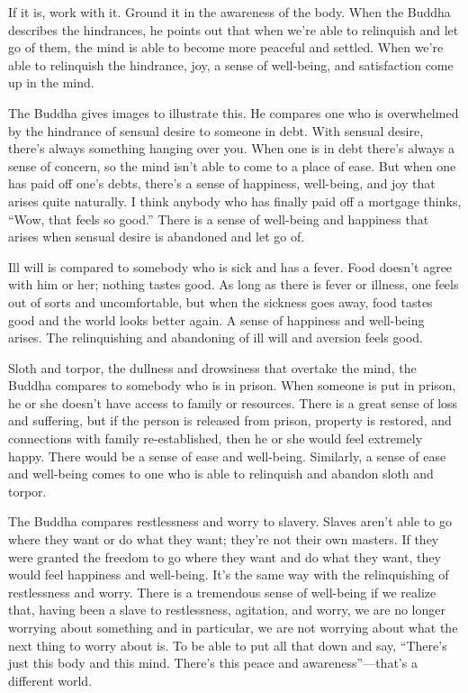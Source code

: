 If it is, work with it. Ground it in the awareness of the body. When the
Buddha describes the hindrances, he points out that when we’re able to
relinquish and let go of them, the mind is able to become more peaceful
and settled. When we’re able to relinquish the hindrance, joy, a sense
of well-being, and satisfaction come up in the mind.

The Buddha gives images to illustrate this. He compares one who is
overwhelmed by the hindrance of sensual desire to someone in debt. With
sensual desire, there’s always something hanging over you. When one is
in debt there’s always a sense of concern, so the mind isn’t able to
come to a place of ease. But when one has paid off one’s debts, there’s
a sense of happiness, well-being, and joy that arises quite naturally. I
think anybody who has finally paid off a mortgage thinks, “Wow, that
feels so good.” There is a sense of well-being and happiness that arises
when sensual desire is abandoned and let go of.

Ill will is compared to somebody who is sick and has a fever. Food
doesn’t agree with him or her; nothing tastes good. As long as there is
fever or illness, one feels out of sorts and uncomfortable, but when the
sickness goes away, food tastes good and the world looks better again. A
sense of happiness and well-being arises. The relinquishing and
abandoning of ill will and aversion feels good.

Sloth and torpor, the dullness and drowsiness that overtake the mind,
the Buddha compares to somebody who is in prison. When someone is put in
prison, he or she doesn’t have access to family or resources. There is a
great sense of loss and suffering, but if the person is released from
prison, property is restored, and connections with family
re-established, then he or she would feel extremely happy. There would
be a sense of ease and well-being. Similarly, a sense of ease and
well-being comes to one who is able to relinquish and abandon sloth and
torpor.

The Buddha compares restlessness and worry to slavery. Slaves aren’t
able to go where they want or do what they want; they’re not their own
masters. If they were granted the freedom to go where they want and do
what they want, they would feel happiness and well-being. It’s the same
way with the relinquishing of restlessness and worry. There is a
tremendous sense of well-being if we realize that, having been a slave
to restlessness, agitation, and worry, we are no longer worrying about
something and in particular, we are not worrying about what the next
thing to worry about is. To be able to put all that down and say,
“There’s just this body and this mind. There’s this peace and
awareness”—that’s a different world.

